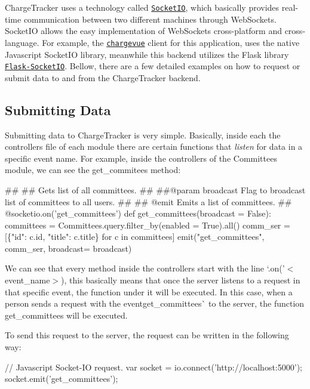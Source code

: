 Charge\+Tracker uses a technology called \href{https://socket.io/}{\tt Socket\+IO}, which basically provides real-\/time communication between two different machines through Web\+Sockets. Socket\+IO allows the easy implementation of Web\+Sockets cross-\/platform and cross-\/language. For example, the \href{https://github.com/ritstudentgovernment/chargevue}{\tt chargevue} client for this application, uses the native Javascript Socket\+IO library, meanwhile this backend utilizes the Flask library \href{https://flask-socketio.readthedocs.io/en/latest/}{\tt Flask-\/\+Socket\+IO}. Bellow, there are a few detailed examples on how to request or submit data to and from the Charge\+Tracker backend.\hypertarget{index_submitData}{}\subsection{Submitting Data}\label{index_submitData}
Submitting data to Charge\+Tracker is very simple. Basically, inside each the controllers file of each module there are certain functions that {\itshape listen} for data in a specific event name. For example, inside the controllers of the Committees module, we can see the {\ttfamily get\+\_\+commitees} method\+:


\begin{DoxyCode}
##
##  Gets list of all committees.
##
##@param broadcast  Flag to broadcast list of committees to all users.
##
## @emit       Emits a list of committees.
##
@socketio.on('get\_committees')
def get\_committees(broadcast = False):
    committees = Committees.query.filter\_by(enabled = True).all()
    comm\_ser = [\{"id": c.id, "title": c.title\} for c in committees]
    emit("get\_committees", comm\_ser, broadcast= broadcast)
\end{DoxyCode}


We can see that every method inside the controllers start with the line `.on('$<$event\+\_\+name$>$\textquotesingle{}){\ttfamily , this basically means that once the server listens to a request in that specific event, the function under it will be executed. In this case, when a person sends a request with the event}get\+\_\+committees\`{} to the server, the function get\+\_\+committees will be executed.

To send this request to the server, the request can be written in the following way\+:


\begin{DoxyCode}
// Javascript Socket-IO request.
var socket = io.connect('http://localhost:5000');
socket.emit('get\_committees');
\end{DoxyCode}


